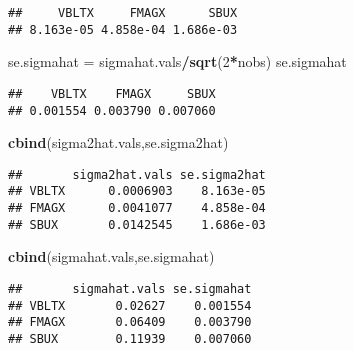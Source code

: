 \documentclass[]{article}
\newenvironment{Shaded}{\begin{snugshade}}{\end{snugshade}}
\newcommand{\KeywordTok}[1]{\textcolor[rgb]{0.13,0.29,0.53}{\textbf{#1}}}
\newcommand{\DecValTok}[1]{\textcolor[rgb]{0.00,0.00,0.81}{#1}}
\newcommand{\StringTok}[1]{\textcolor[rgb]{0.31,0.60,0.02}{#1}}
\newcommand{\CommentTok}[1]{\textcolor[rgb]{0.56,0.35,0.01}{\textit{#1}}}
\newcommand{\OperatorTok}[1]{\textcolor[rgb]{0.81,0.36,0.00}{\textbf{#1}}}
\newcommand{\NormalTok}[1]{#1}
\begin{document}
\begin{verbatim}
##     VBLTX     FMAGX      SBUX 
## 8.163e-05 4.858e-04 1.686e-03
\end{verbatim}

\begin{Shaded}
\begin{Highlighting}[]
\NormalTok{se.sigmahat =}\StringTok{ }\NormalTok{sigmahat.vals}\OperatorTok{/}\KeywordTok{sqrt}\NormalTok{(}\DecValTok{2}\OperatorTok{*}\NormalTok{nobs)}
\NormalTok{se.sigmahat}
\end{Highlighting}
\end{Shaded}

\begin{verbatim}
##    VBLTX    FMAGX     SBUX 
## 0.001554 0.003790 0.007060
\end{verbatim}

\begin{Shaded}
\begin{Highlighting}[]
\KeywordTok{cbind}\NormalTok{(sigma2hat.vals,se.sigma2hat)}
\end{Highlighting}
\end{Shaded}

\begin{verbatim}
##       sigma2hat.vals se.sigma2hat
## VBLTX      0.0006903    8.163e-05
## FMAGX      0.0041077    4.858e-04
## SBUX       0.0142545    1.686e-03
\end{verbatim}

\begin{Shaded}
\begin{Highlighting}[]
\KeywordTok{cbind}\NormalTok{(sigmahat.vals,se.sigmahat)}
\end{Highlighting}
\end{Shaded}

\begin{verbatim}
##       sigmahat.vals se.sigmahat
## VBLTX       0.02627    0.001554
## FMAGX       0.06409    0.003790
## SBUX        0.11939    0.007060
\end{verbatim}

\begin{Shaded}
\end{Shaded}
\end{document}
